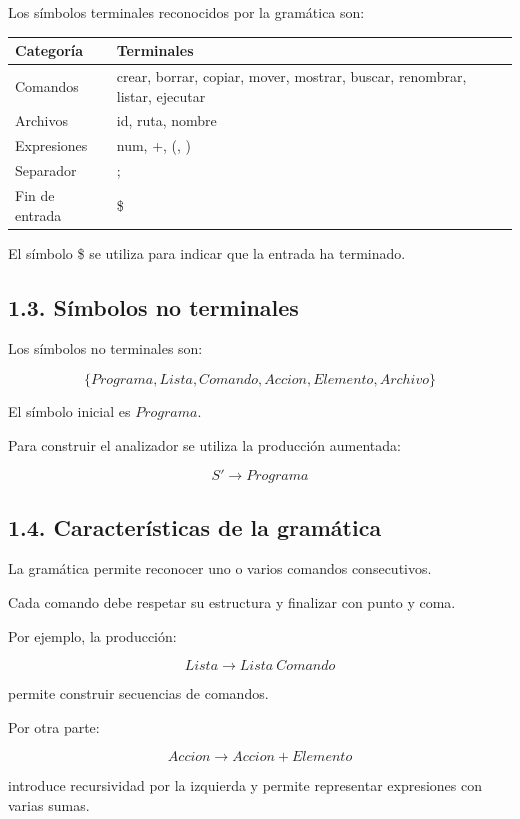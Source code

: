 \documentclass[11pt,letterpaper]{article}
\begin{document}
Los símbolos terminales reconocidos por la gramática son:

\begin{center}
\begin{tabular}{|l|p{10cm}|}
\hline
\textbf{Categoría} & \textbf{Terminales} \\ \hline
Comandos &
crear, borrar, copiar, mover, mostrar, buscar,
renombrar, listar, ejecutar \\ \hline
Archivos & id, ruta, nombre \\ \hline
Expresiones & num, +, (, ) \\ \hline
Separador & ; \\ \hline
Fin de entrada & \$ \\ \hline
\end{tabular}
\end{center}

El símbolo \$ se utiliza para indicar que la entrada
ha terminado.

\subsection*{1.3. Símbolos no terminales}

Los símbolos no terminales son:

\[
\{
Programa, Lista, Comando,
Accion, Elemento, Archivo
\}
\]

El símbolo inicial es $Programa$.

Para construir el analizador se utiliza la producción
aumentada:

\[
S' \rightarrow Programa
\]

\subsection*{1.4. Características de la gramática}

La gramática permite reconocer uno o varios comandos
consecutivos.

Cada comando debe respetar su estructura y finalizar
con punto y coma.

Por ejemplo, la producción:

\[
Lista \rightarrow Lista\ Comando
\]

permite construir secuencias de comandos.

Por otra parte:

\[
Accion \rightarrow Accion + Elemento
\]

introduce recursividad por la izquierda y permite
representar expresiones con varias sumas.
\end{document}
